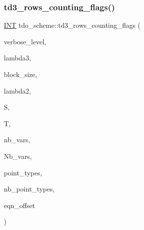 \subsubsection{\texorpdfstring{td3\+\_\+rows\+\_\+counting\+\_\+flags()}{td3\_rows\_counting\_flags()}}
{\footnotesize\ttfamily \mbox{\hyperlink{galois_8h_a09fddde158a3a20bd2dcadb609de11dc}{I\+NT}} tdo\+\_\+scheme\+::td3\+\_\+rows\+\_\+counting\+\_\+flags (\begin{DoxyParamCaption}\item[{\mbox{\hyperlink{galois_8h_a09fddde158a3a20bd2dcadb609de11dc}{I\+NT}}}]{verbose\+\_\+level,  }\item[{\mbox{\hyperlink{galois_8h_a09fddde158a3a20bd2dcadb609de11dc}{I\+NT}}}]{lambda3,  }\item[{\mbox{\hyperlink{galois_8h_a09fddde158a3a20bd2dcadb609de11dc}{I\+NT}}}]{block\+\_\+size,  }\item[{\mbox{\hyperlink{galois_8h_a09fddde158a3a20bd2dcadb609de11dc}{I\+NT}}}]{lambda2,  }\item[{\mbox{\hyperlink{galois_8h_a09fddde158a3a20bd2dcadb609de11dc}{I\+NT}} \&}]{S,  }\item[{\mbox{\hyperlink{classtdo__data}{tdo\+\_\+data}} \&}]{T,  }\item[{\mbox{\hyperlink{galois_8h_a09fddde158a3a20bd2dcadb609de11dc}{I\+NT}}}]{nb\+\_\+vars,  }\item[{\mbox{\hyperlink{galois_8h_a09fddde158a3a20bd2dcadb609de11dc}{I\+NT}}}]{Nb\+\_\+vars,  }\item[{\mbox{\hyperlink{galois_8h_a09fddde158a3a20bd2dcadb609de11dc}{I\+NT}} $\ast$\&}]{point\+\_\+types,  }\item[{\mbox{\hyperlink{galois_8h_a09fddde158a3a20bd2dcadb609de11dc}{I\+NT}} \&}]{nb\+\_\+point\+\_\+types,  }\item[{\mbox{\hyperlink{galois_8h_a09fddde158a3a20bd2dcadb609de11dc}{I\+NT}}}]{eqn\+\_\+offset }\end{DoxyParamCaption})}

\mbox{\label{classtdo__scheme_ad09f6363c43350f6e7fa1ee0b9420530}} 
